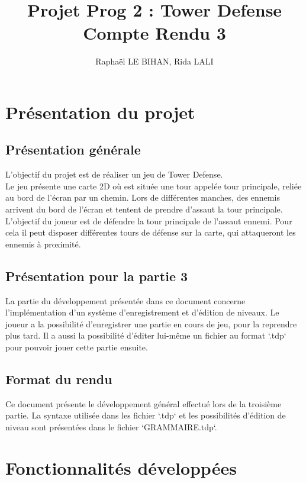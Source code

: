 \documentclass{article}
\title{
  Projet Prog 2 : Tower Defense\\
  \large Compte Rendu 3
}
\author{Raphaël LE BIHAN, Rida LALI}
\begin{document}
\maketitle

\section{Présentation du projet}

\subsection{Présentation générale}

L'objectif du projet est de réaliser un jeu de Tower Defense.\\
Le jeu présente une carte 2D où est située une tour appelée tour principale, reliée au bord de l'écran par un chemin. Lors de différentes manches, des ennemis arrivent du bord de l'écran et tentent de prendre d'assaut la tour principale.\\
L'objectif du joueur est de défendre la tour principale de l'assaut ennemi. Pour cela il peut disposer différentes tours de défense sur la carte, qui attaqueront les ennemis à proximité.

\subsection{Présentation pour la partie 3}

La partie du développement présentée dans ce document concerne l'implémentation d'un système d'enregistrement et d'édition de niveaux.
Le joueur a la possibilité d'enregistrer une partie en cours de jeu, pour la reprendre plus tard.
Il a aussi la possibilité d'éditer lui-même un fichier au format `.tdp` pour pouvoir jouer cette partie ensuite.

\subsection{Format du rendu}

Ce document présente le développement général effectué lors de la troisième partie.
La syntaxe utilisée dans les fichier `.tdp` et les possibilités d'édition de niveau sont présentées dans le fichier `GRAMMAIRE.tdp`.

\section{Fonctionnalités développées}
\end{document}
